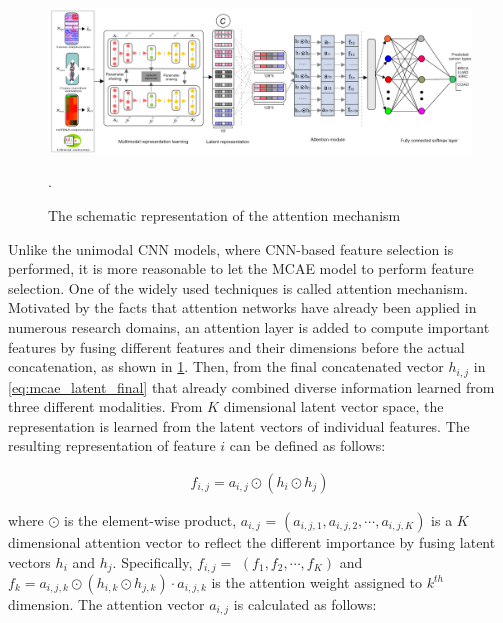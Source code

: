 \begin{figure}
	\centering
	\includegraphics[scale=0.6]{images/attention.png}	\caption{The schematic representation of the attention mechanism}.	
    \vspace{-2mm}
	\label{fig:attention}
\end{figure}

\hspace*{3.5mm} Unlike the unimodal CNN models, where CNN-based feature selection is performed, it is more reasonable to let the MCAE model to perform feature selection. One of the widely used techniques is called attention mechanism. Motivated by the facts that attention networks have already been applied in numerous research domains, an attention layer is added to compute important features by fusing different features and their dimensions before the actual concatenation, as shown in \cref{fig:attention}. Then, from the final concatenated vector $h_{i,j}$ in \cref{eq:mcae_latent_final} that already combined diverse information learned from three different modalities. From $K$  dimensional latent vector space, the representation is learned from the latent vectors of individual features. The resulting representation of feature $i$ can be defined as follows: 

\vspace{-6mm}
\begin{align}
    f_{i,j}=a_{i,j} \odot\left(h_{i} \odot h_{j}\right)
\end{align}
\vspace{-6mm}

\hspace*{3.5mm} where $\odot$ is the element-wise product, $a_{i,j}$ = $\left(a_{i,j,1}, a_{i,j,2}, \cdots, a_{i,j,K}\right)$ is a $K$ dimensional attention vector to reflect the different importance by fusing latent vectors $h_{i}$ and $h_{j}$. Specifically, $f_{i,j}=$ $\left(f_{1}, f_{2}, \cdots, f_{K}\right)$ and $f_{k}=a_{i,j,k} \odot\left(h_{i,k} \odot h_{j,k}\right) \cdot a_{i,j,k}$ is the attention weight assigned to $k^{th}$ dimension. The attention vector $a_{i,j}$ is calculated as follows: 
 
